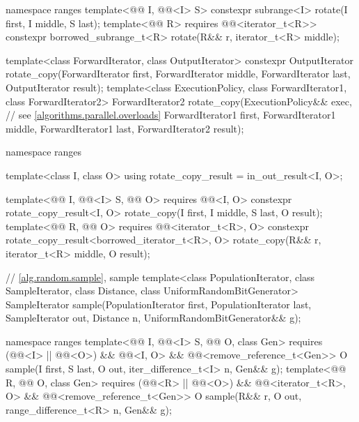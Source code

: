 \begin{codeblock}
{  namespace ranges {
    template<@@ I, @@<I> S>
      constexpr subrange<I> rotate(I first, I middle, S last);
    template<@@ R>
      requires @@<iterator_t<R>>
      constexpr borrowed_subrange_t<R> rotate(R&& r, iterator_t<R> middle);
  }

  template<class ForwardIterator, class OutputIterator>
    constexpr OutputIterator
      rotate_copy(ForwardIterator first, ForwardIterator middle,
                  ForwardIterator last, OutputIterator result);
  template<class ExecutionPolicy, class ForwardIterator1, class ForwardIterator2>
    ForwardIterator2
      rotate_copy(ExecutionPolicy&& exec,                       // see \ref{algorithms.parallel.overloads}
                  ForwardIterator1 first, ForwardIterator1 middle,
                  ForwardIterator1 last, ForwardIterator2 result);

  namespace ranges {
    template<class I, class O>
      using rotate_copy_result = in_out_result<I, O>;

    template<@@ I, @@<I> S, @@ O>
      requires @@<I, O>
      constexpr rotate_copy_result<I, O>
        rotate_copy(I first, I middle, S last, O result);
    template<@@ R, @@ O>
      requires @@<iterator_t<R>, O>
      constexpr rotate_copy_result<borrowed_iterator_t<R>, O>
        rotate_copy(R&& r, iterator_t<R> middle, O result);
  }

  // \ref{alg.random.sample}, sample
  template<class PopulationIterator, class SampleIterator,
           class Distance, class UniformRandomBitGenerator>
    SampleIterator sample(PopulationIterator first, PopulationIterator last,
                          SampleIterator out, Distance n,
                          UniformRandomBitGenerator&& g);

  namespace ranges {
    template<@@ I, @@<I> S,
             @@ O, class Gen>
      requires (@@<I> || @@<O>) &&
               @@<I, O> &&
               @@<remove_reference_t<Gen>>
      O sample(I first, S last, O out, iter_difference_t<I> n, Gen&& g);
    template<@@ R, @@ O, class Gen>
      requires (@@<R> || @@<O>) &&
               @@<iterator_t<R>, O> &&
               @@<remove_reference_t<Gen>>
      O sample(R&& r, O out, range_difference_t<R> n, Gen&& g);
  }

}
\end{codeblock}
